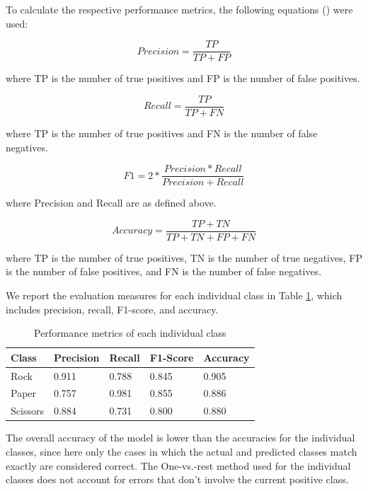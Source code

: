 \documentclass[a4paper]{article}
\begin{document}
To calculate the respective performance metrics, the following equations (\cite{metric_formulas}) were used:

\begin{equation}
	Precision = \frac{TP}{TP + FP}
\end{equation}

where TP is the number of true positives and FP is the number of false positives.

\begin{equation}
	Recall = \frac{TP}{TP + FN}
\end{equation}

where TP is the number of true positives and FN is the number of false negatives.

\begin{equation}
	F1 = 2 * \frac{Precision * Recall}{Precision + Recall}
\end{equation}

where Precision and Recall are as defined above.

\begin{equation}
	Accuracy = \frac{TP + TN}{TP + TN + FP + FN}
\end{equation}

where TP is the number of true positives, TN is the number of true negatives, FP is the number of false positives, and FN is the number of false negatives.
\newline

We report the evaluation measures for each individual class in Table \ref{tbl:metrics_model}, which includes precision, recall, F1-score, and accuracy.

\begin{table}[h]
	\centering
	\caption{Performance metrics of each individual class}
	\label{tbl:metrics_model}
	\begin{tabular}{@{}lllll@{}}
		\toprule
		Class    & Precision & Recall & F1-Score & Accuracy \\ \midrule
		Rock     & 0.911     & 0.788  & 0.845    & 0.905    \\
		Paper    & 0.757     & 0.981  & 0.855    & 0.886    \\
		Scissors & 0.884     & 0.731  & 0.800    & 0.880    \\ \bottomrule
	\end{tabular}
\end{table}


The overall accuracy of the model is lower than the accuracies for the individual classes, since here only the cases in which the actual and predicted classes match exactly are considered correct. The One-vs.-rest method used for the individual classes does not account for errors that don't involve the current positive class.
\end{document}
